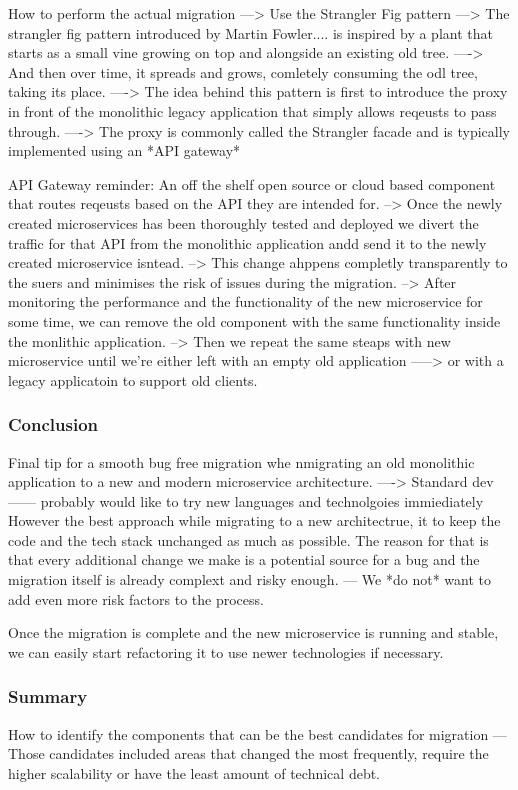 \documentclass[a4paper, 11pt]{book}
\begin{document}
{    How to perform the actual migration
    ---> Use the Strangler Fig pattern
    ---> The strangler fig pattern introduced by Martin Fowler.... is inspired by a plant that starts as a small vine growing on top and alongside an existing old tree.
    ----> And then over time, it spreads and grows, comletely consuming the odl tree, taking its place.
    ----> The idea behind this pattern is first to introduce the proxy in front of the monolithic legacy application that simply allows reqeusts to pass through.
    ----> The proxy is commonly called the Strangler facade and is typically implemented using an *API gateway*

    API Gateway reminder: An off the shelf open source or cloud based component that routes reqeusts based on the API they are intended for.
    --> Once the newly created microservices has been thoroughly tested and deployed we divert the traffic for that API from the monolithic application andd send it to the newly created microservice isntead.
    --> This change ahppens completly transparently to the suers and minimises the risk of issues during the migration.
    --> After monitoring the performance and the functionality of the new microservice for some time, we can remove the old component with the same functionality inside the monlithic application.
    --> Then we repeat the same steaps with new microservice until we're either left with an empty old application
    -----> or with a legacy applicatoin to support old clients.

    \subsubsection{Conclusion}
    Final tip for a smooth bug free migration whe nmigrating an old monolithic application to a new and modern microservice architecture.
    ----> Standard dev------ probably would like to try new languages and technolgoies immiediately
    However the best approach while migrating to a new architectrue, it to keep the code and the tech stack unchanged as much as possible.
    The reason for that is that every additional change we make is a potential source for a bug and the migration itself is already complext and risky enough.
    --- We *do not* want to add even more risk factors to the process.

    Once the migration is complete and the new microservice is running and stable, we can easily start refactoring it to use newer technologies if necessary.

    \subsubsection{Summary}
    How to identify the components that can be the best candidates for migration
    --- Those candidates included areas that changed the most frequently, require the higher scalability or have the least amount of technical debt.

}
\end{document}

